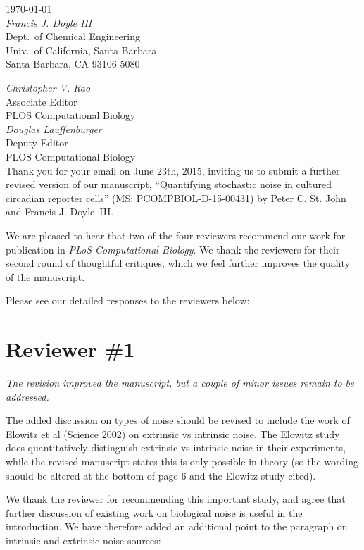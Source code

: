 \documentclass[11pt, letterpaper]{article}
\newenvironment{reviewer}{\itshape\color{gray}}{}
\begin{document}
\begin{flushright}
\today\\[2ex]
{\itshape Francis J. Doyle III}\\
Dept.\ of Chemical Engineering\\
Univ.\ of California, Santa Barbara\\
Santa Barbara, CA 93106-5080\\
\end{flushright}

{\itshape Christopher V. Rao}\\
Associate Editor\\
PLOS Computational Biology\\

{\itshape Douglas Lauffenburger}\\
Deputy Editor\\
PLOS Computational Biology\\

Thank you for your email on June 23th, 2015, inviting us to submit a further revised version of our manuscript, ``Quantifying stochastic noise in cultured circadian reporter cells'' (MS: PCOMPBIOL-D-15-00431) by Peter C. St. John and Francis J. Doyle~III.

We are pleased to hear that two of the four reviewers recommend our work for publication in {\itshape PLoS Computational Biology}. We thank the reviewers for their second round of thoughtful critiques, which we feel further improves the quality of the manuscript.

Please see our detailed responses to the reviewers below: 

\section*{Reviewer \#1}
\begin{reviewer}
The revision improved the manuscript, but a couple of minor issues remain to be addressed.

The added discussion on types of noise should be revised to include the work of Elowitz et al (Science 2002) on extrinsic vs intrinsic noise. The Elowitz study does quantitatively distinguish extrinsic vs intrinsic noise in their experiments, while the revised manuscript states this is only possible in theory (so the wording should be altered at the bottom of page 6 and the Elowitz study cited). 
\end{reviewer}

We thank the reviewer for recommending this important study, and agree that further discussion of existing work on biological noise is useful in the introduction. We have therefore added an additional point to the paragraph on intrinsic and extrinsic noise sources:
\end{document}
